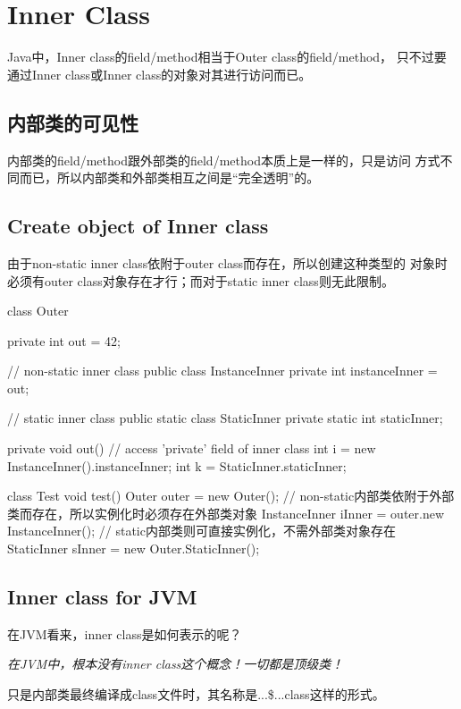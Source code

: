 ﻿\section[Inner Class]{Inner Class}
Java中，Inner class的field/method相当于Outer class的field/method，
只不过要通过Inner class或Inner class的对象对其进行访问而已。

\subsection[内部类的可见性]{内部类的可见性}
内部类的field/method跟外部类的field/method本质上是一样的，只是访问
方式不同而已，所以内部类和外部类相互之间是“完全透明”的。

\subsection[Create object of Inner class ]{Create object of Inner class}
由于non-static inner class依附于outer class而存在，所以创建这种类型的
对象时必须有outer class对象存在才行；而对于static inner class则无此限制。

\begin{javacode}
class Outer {
  private int out = 42;

  // non-static inner class
  public class InstanceInner {
    private int instanceInner = out;
  }

  // static inner class
  public static class StaticInner {
    private static int staticInner;
  }

  private void out() {
    // access 'private' field of inner class
    int i = new InstanceInner().instanceInner;
    int k = StaticInner.staticInner;
  }
}

class Test {
  void test() {
    Outer outer = new Outer();
    // non-static内部类依附于外部类而存在，所以实例化时必须存在外部类对象
    InstanceInner iInner = outer.new InstanceInner();
    // static内部类则可直接实例化，不需外部类对象存在
    StaticInner sInner = new Outer.StaticInner();
  }
}
\end{javacode}

\subsection[Inner class for JVM]{Inner class for JVM}
在JVM看来，inner class是如何表示的呢？

\emph{在JVM中，根本没有inner class这个概念！一切都是顶级类！}

只是内部类最终编译成class文件时，其名称是...\$...class这样的形式。

